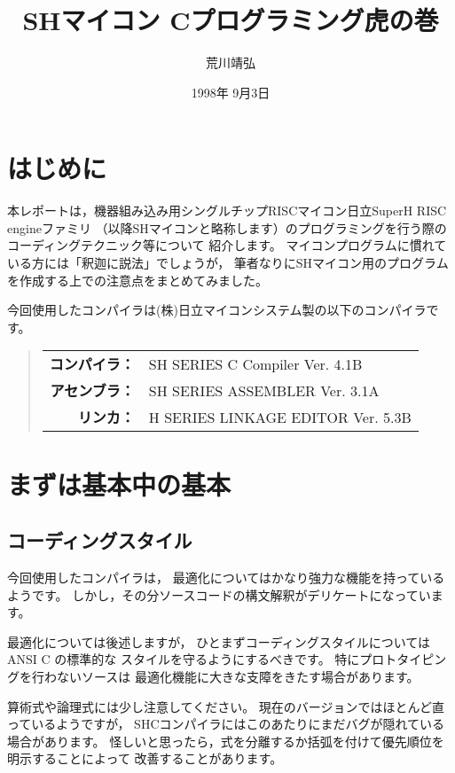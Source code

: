 \documentclass[a4j,10pt,fleqn]{jsarticle}
\title{\textbf{SHマイコン Cプログラミング虎の巻}}
\author{荒川靖弘}
\date{1998年 9月3日}
\begin{document}
\maketitle

\tableofcontents


\clearpage
\section{はじめに}

本レポートは，機器組み込み用シングルチップRISCマイコン日立SuperH RISC engineファミリ
（以降SHマイコンと略称します）のプログラミングを行う際のコーディングテクニック等について
紹介します。
マイコンプログラムに慣れている方には「釈迦に説法」でしょうが，
筆者なりにSHマイコン用のプログラムを作成する上での注意点をまとめてみました。

今回使用したコンパイラは(株)日立マイコンシステム製の以下のコンパイラです。
\begin{quote}\begin{tabular}{rl}
\textbf{コンパイラ：}  & SH SERIES C Compiler Ver. 4.1B \\
\textbf{アセンブラ：}  & SH SERIES ASSEMBLER Ver. 3.1A \\
\textbf{リンカ：}      & H SERIES LINKAGE EDITOR Ver. 5.3B \\
\end{tabular}\end{quote}


\section{まずは基本中の基本}

\subsection{コーディングスタイル}

今回使用したコンパイラは，
最適化についてはかなり強力な機能を持っているようです。
しかし，その分ソースコードの構文解釈がデリケートになっています。

最適化については後述しますが，
ひとまずコーディングスタイルについては ANSI C の標準的な
スタイルを守るようにするべきです。
特にプロトタイピングを行わないソースは
最適化機能に大きな支障をきたす場合があります。

算術式や論理式には少し注意してください。
現在のバージョンではほとんど直っているようですが，
SHCコンパイラにはこのあたりにまだバグが隠れている場合があります。
怪しいと思ったら，式を分離するか括弧を付けて優先順位を明示することによって
改善することがあります。
\end{document}
